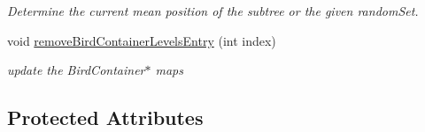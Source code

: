 \begin{CompactItemize}
\begin{CompactList}\small\item\em Determine the current mean position of the subtree or the given randomSet. \item\end{CompactList}\item 
void \hyperlink{classPyramidSwarm_a33082c7cb70dd7bf2e33f97c4c69e01}{removeBirdContainerLevelsEntry} (int index)
\begin{CompactList}\small\item\em update the BirdContainer$\ast$ maps \item\end{CompactList}\end{CompactItemize}
\subsection*{Protected Attributes}

